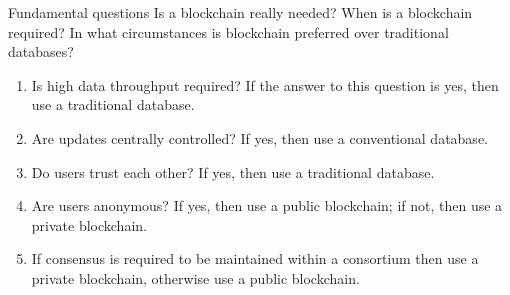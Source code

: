 \documentclass[serif]{beamer}
\begin{document}
\begin{frame}{Fundamental questions}
 Is a blockchain really needed? When is a blockchain required? In
	what circumstances is blockchain preferred over traditional databases? 
	\begin{enumerate}[<+->]
		\item Is high data throughput required? If the answer to this question is yes, then use a traditional database.
		\item Are updates centrally controlled? If yes, then use a conventional database.
		\item Do users trust each other? If yes, then use a traditional database.
		\item Are users anonymous? If yes, then use a public blockchain; if not, then use a private blockchain.
		\item If consensus is required to be maintained within a consortium then use a private blockchain, otherwise use
		a public blockchain. 
	\end{enumerate}
\end{frame}
\end{document}
